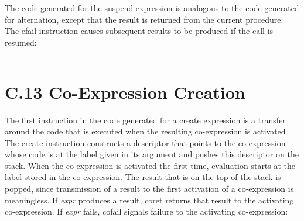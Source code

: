 \bigskip

\begin{center}
\tablelasttail{\hline}
\begin{supertabular}{|m{1.9073598in}|m{2.75596in}|}

\end{supertabular}
\end{center}

The code generated for the suspend expression is analogous to the code
generated for alternation, except that the result is returned from the
current procedure. The efail instruction causes subsequent results to
be produced if the call is resumed:

\begin{center}
\tablelasttail{\hline}
\begin{supertabular}{|m{1.9073598in}|m{2.75596in}|}

\end{supertabular}
\end{center}


\section{C.13 Co-Expression Creation}

The first instruction in the code generated for a create expression is
a transfer around the code that is executed when the resulting
co-expression is activated The create instruction constructs a
descriptor that points to the co-expression whose code is at the label
given in its argument and pushes this descriptor on the stack. When
the co-expression is activated the first time, evaluation starts at
the label stored in the co-expression. The result that is on the top
of the stack is popped, since transmission of a result to the first
activation of a co-expression is meaningless. If \textit{expr}
produces a result, coret returns that result to the activating
co-expression. If \textit{expr} fails, cofail signals failure to the
activating co-expression:

